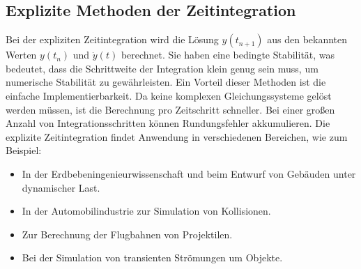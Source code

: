 \documentclass[letterpaper,10pt,german]{jupyterBook}
\begin{document}
\subsection{Explizite Methoden der Zeitintegration}
\label{\detokenize{chapters/chapter6/TransienteDynamik:explizite-methoden-der-zeitintegration}}
\sphinxAtStartPar
Bei der expliziten Zeitintegration wird die Lösung \( y(t_{n+1}) \)  aus den bekannten Werten \(y(t_n)\) und \(\dot{y}(t)\) berechnet. Sie haben eine bedingte Stabilität, was bedeutet, dass die Schrittweite der Integration klein genug sein muss, um numerische Stabilität zu gewährleisten. Ein Vorteil dieser Methoden ist die einfache Implementierbarkeit. Da keine komplexen Gleichungssysteme gelöst werden müssen, ist die Berechnung pro Zeitschritt schneller. Bei einer großen Anzahl von Integrationsschritten können Rundungsfehler akkumulieren. Die explizite Zeitintegration findet Anwendung in verschiedenen Bereichen, wie zum Beispiel:
\begin{itemize}
\item {} 
\sphinxAtStartPar
{} In der Erdbebeningenieurwissenschaft und beim Entwurf von Gebäuden unter dynamischer Last.

\item {} 
\sphinxAtStartPar
{} In der Automobilindustrie zur Simulation von Kollisionen.

\item {} 
\sphinxAtStartPar
{} Zur Berechnung der Flugbahnen von Projektilen.

\item {} 
\sphinxAtStartPar
{} Bei der Simulation von transienten Strömungen um Objekte.

\end{itemize}
\end{document}
